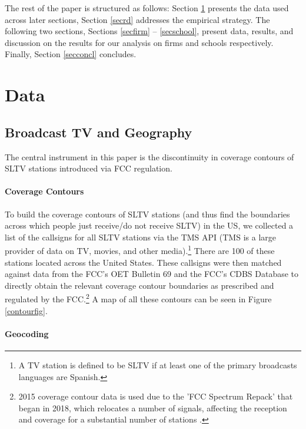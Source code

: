 \documentclass[11pt]{article}
\begin{document}


The rest of the paper is structured as follows: Section \ref{secdata} presents the data used across later sections, Section \ref{secrd} addresses the empirical strategy. The following two sections, Sections \ref{secfirm} -- \ref{secschool}, present data, results, and discussion on the results for our analysis on firms and schools respectively. Finally, Section \ref{secconcl} concludes.


\section{Data}\label{secdata}


\subsection{Broadcast TV and Geography}

The central instrument in this paper is the discontinuity in coverage contours of SLTV stations introduced via FCC regulation.

\paragraph{Coverage Contours} 

To build the coverage contours of SLTV stations (and thus find the boundaries across which people just receive/do not receive SLTV) in the US, we collected a list of the callsigns for all SLTV stations via the TMS API (TMS is a large provider of data on TV, movies, and other media).\footnote{ A TV station is defined to be SLTV if at least one of the primary broadcasts languages are Spanish.} There are 100 of these stations located across the United States. These callsigns were then matched against data from the FCC's OET Bulletin 69 and the FCC's CDBS Database to directly obtain the relevant coverage contour boundaries as prescribed and regulated by the FCC.\footnote{ 2015 coverage contour data is used due to the 'FCC Spectrum Repack' that began in 2018, which relocates a number of signals, affecting the reception and coverage for a substantial number of stations \citep{fletcher_fcc_2018}.} 
A map of all these contours can be seen in Figure \ref{contourfig}.

\paragraph{Geocoding}
\end{document}
